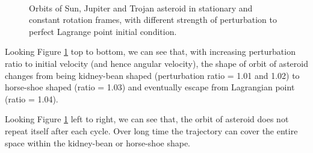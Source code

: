 \documentclass[12pt,a4paper]{article}
\begin{document}
\begin{figure}[H]
 \\

\caption{Orbits of Sun, Jupiter and Trojan asteroid in stationary and constant rotation frames, with different strength of perturbation to perfect Lagrange point initial condition.}
\label{fig:bigchart}
\end{figure}

Looking Figure \ref{fig:bigchart} top to bottom, we can see that, with increasing perturbation ratio to initial velocity (and hence angular velocity), the shape of orbit of asteroid changes from being kidney-bean shaped (perturbation ratio = 1.01 and 1.02) to horse-shoe shaped (ratio = 1.03) and eventually escape from Lagrangian point (ratio = 1.04).

Looking Figure \ref{fig:bigchart} left to right, we can see that, the orbit of asteroid does not repeat itself after each cycle. Over long time the trajectory can cover the entire space within the kidney-bean or horse-shoe shape.
\end{document}
